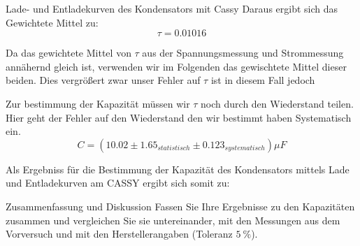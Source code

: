 \documentclass[twoside]{protokoll}
\begin{document}
\begin{aufgabe}{Lade- und Entladekurven des Kondensators mit Cassy}
Daraus ergibt sich das Gewichtete Mittel zu:\\

\begin{equation}
 \tau = 0.01016
\end{equation}

Da das gewichtete Mittel von $\tau$ aus der Spannungsmessung und Strommessung annähernd gleich ist, verwenden wir im Folgenden das gewischtete Mittel dieser beiden. Dies vergrößert zwar unser Fehler auf $\tau$ ist in diesem Fall jedoch 



Zur bestimmung der Kapazität müssen wir $\tau$ noch durch den Wiederstand teilen. Hier geht der Fehler auf den Wiederstand den wir bestimmt haben Systematisch ein. 
\begin{equation}
    C = (10.02 \pm 1.65_{statistisch} \pm 0.123_{systematisch}) \mu F
\end{equation}

Als Ergebniss für die Bestimmung der Kapazität des Kondensators mittels Lade und Entladekurven am CASSY ergibt sich somit zu:


\end{aufgabe}

\begin{aufgabe}{Zusammenfassung und Diskussion}
  Fassen Sie Ihre Ergebnisse zu den Kapazitäten zusammen und
  vergleichen Sie sie untereinander, mit den Messungen aus dem
  Vorversuch und mit den Herstellerangaben (Toleranz
  $\SI{5}{\percent}$).  

\end{aufgabe}
 
\end{document}
